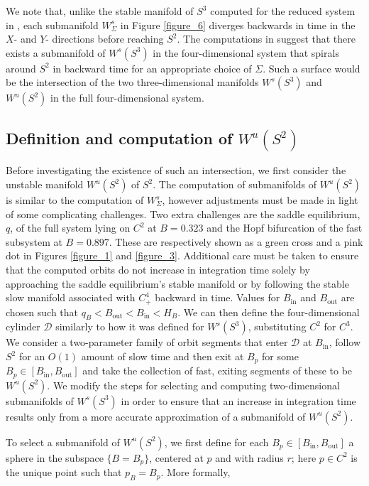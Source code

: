 \documentclass{ws-ijbc}
\begin{document}
We note that, unlike the stable manifold of $S^3$ computed for the reduced system in \cite{QSSA}, each submanifold $W^{s}_{\Sigma}$ in Figure \ref{figure_6} diverges backwards in time in the $X$- and $Y$- directions before reaching $S^2$.  The computations in \cite{QSSA} suggest that there exists a  submanifold of $W^s(S^3)$ in the four-dimensional system that spirals around $S^2$ in backward time for an appropriate choice of $\Sigma$.  Such a surface would be the intersection of the two three-dimensional manifolds $W^s(S^3)$ and $W^u(S^2)$ in the full four-dimensional system.  

\subsection{Definition and computation of $W^{u}(S^2)$}  

Before investigating the existence of such an intersection, we first consider the unstable manifold $W^{u}(S^2)$ of $S^2$.  The computation of submanifolds of $W^{u}(S^2)$ is similar to the computation of $W^{s}_\Sigma$, however adjustments must be made in light of some complicating challenges.  Two extra challenges are the saddle equilibrium, $q$, of the full system lying on $C^2$ at $B = 0.323$ and the Hopf bifurcation of the fast subsystem at $B = 0.897$.  These are respectively shown as a green cross and a pink dot in Figures \ref{figure_1} and \ref{figure_3}.  Additional care must be taken to ensure that the computed orbits do not increase in integration time solely by approaching the saddle equilibrium's stable manifold or by following the stable slow manifold associated with $C^4_+$ backward in time.  Values for $B_{\mathrm{in}}$ and $B_{\mathrm{out}}$ are chosen such that $q_B < B_{\mathrm{out}} < B_{\mathrm{in}}< H_B$.  We can then define the four-dimensional cylinder $\mathscr{D}$ similarly to how it was defined for $W^s(S^3)$, substituting $C^2$ for $C^3$.  We consider a two-parameter family of orbit segments that enter $\mathscr{D}$ at $B_{\mathrm{in}}$, follow $S^2$ for an $O(1)$ amount of slow time and then exit at $B_p$ for some $B_p \in [B_{\mathrm{in}}, B_{\mathrm{out}}]$ and take the collection of fast, exiting segments of these to be $W^u(S^2)$.  We modify the steps for selecting and computing two-dimensional submanifolds of $W^s(S^3)$ in order to ensure that an increase in integration time results only from a more accurate approximation of a submanifold of $W^u(S^2)$.

To select a submanifold of $W^u(S^2)$, we first define for each $B_p \in [B_{\mathrm{in}}, B_{\mathrm{out}}]$ a sphere in the subspace $\{B=B_p\}$, centered at $p$ and with radius $r$; here $p \in C^2$ is the unique point such that $p_B = B_p$.  More formally,
\end{document}
